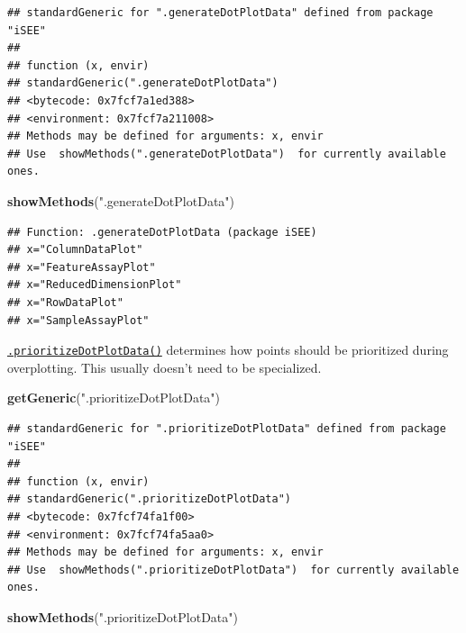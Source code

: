 \documentclass[
]{book}
\newenvironment{Shaded}{\begin{snugshade}}{\end{snugshade}}
\newcommand{\KeywordTok}[1]{\textcolor[rgb]{0.13,0.29,0.53}{\textbf{#1}}}
\newcommand{\NormalTok}[1]{#1}
\newcommand{\StringTok}[1]{\textcolor[rgb]{0.31,0.60,0.02}{#1}}
\begin{document}
\begin{verbatim}
## standardGeneric for ".generateDotPlotData" defined from package "iSEE"
## 
## function (x, envir) 
## standardGeneric(".generateDotPlotData")
## <bytecode: 0x7fcf7a1ed388>
## <environment: 0x7fcf7a211008>
## Methods may be defined for arguments: x, envir
## Use  showMethods(".generateDotPlotData")  for currently available ones.
\end{verbatim}

\begin{Shaded}
\begin{Highlighting}[]
\KeywordTok{showMethods}\NormalTok{(}\StringTok{".generateDotPlotData"}\NormalTok{)}
\end{Highlighting}
\end{Shaded}

\begin{verbatim}
## Function: .generateDotPlotData (package iSEE)
## x="ColumnDataPlot"
## x="FeatureAssayPlot"
## x="ReducedDimensionPlot"
## x="RowDataPlot"
## x="SampleAssayPlot"
\end{verbatim}

\href{https://isee.github.io/iSEE/reference/plot-generics.html}{\texttt{.prioritizeDotPlotData()}} determines how points should be prioritized during overplotting.
This usually doesn't need to be specialized.

\begin{Shaded}
\begin{Highlighting}[]
\KeywordTok{getGeneric}\NormalTok{(}\StringTok{".prioritizeDotPlotData"}\NormalTok{)}
\end{Highlighting}
\end{Shaded}

\begin{verbatim}
## standardGeneric for ".prioritizeDotPlotData" defined from package "iSEE"
## 
## function (x, envir) 
## standardGeneric(".prioritizeDotPlotData")
## <bytecode: 0x7fcf74fa1f00>
## <environment: 0x7fcf74fa5aa0>
## Methods may be defined for arguments: x, envir
## Use  showMethods(".prioritizeDotPlotData")  for currently available ones.
\end{verbatim}

\begin{Shaded}
\begin{Highlighting}[]
\KeywordTok{showMethods}\NormalTok{(}\StringTok{".prioritizeDotPlotData"}\NormalTok{)}
\end{Highlighting}
\end{Shaded}
\end{document}
